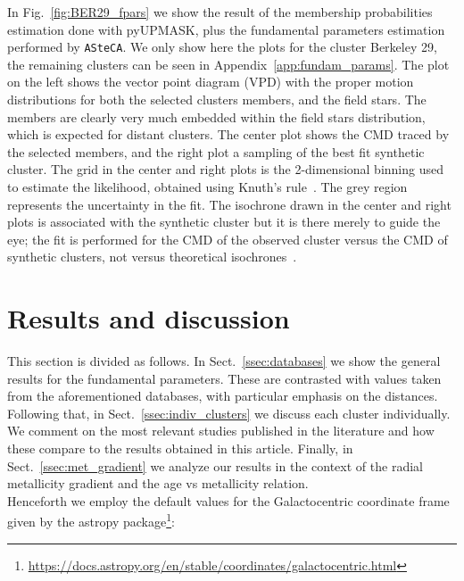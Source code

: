 \documentclass[referee]{aa}
\begin{document}
  In Fig.~\ref{fig:BER29_fpars} we show the result of the membership
  probabilities estimation done with pyUPMASK, plus the fundamental parameters
  estimation performed by \texttt{ASteCA}. We only show here the plots for
  the cluster Berkeley 29, the remaining clusters can be seen in
  Appendix~\ref{app:fundam_params}.
  The plot on the left shows the vector point diagram (VPD) with the proper
  motion distributions for both the selected clusters members, and the field
  stars. The members are clearly very much embedded within the field stars
  distribution, which is expected for distant clusters. The center plot shows
  the CMD traced by the selected members, and the right plot a sampling of the
  best fit synthetic cluster. The grid in the center and right plots is
  the 2-dimensional binning used to estimate the likelihood, obtained using
  Knuth's rule~\citep{Knuth_2006}. The grey region represents the uncertainty
  in the fit. The isochrone drawn in the center and right plots is associated
  with the synthetic cluster but it is there merely to guide the eye; the fit is
  performed for the CMD of the observed cluster versus the CMD of synthetic
  clusters, not versus theoretical isochrones~\citep[this is further
  explained in:][]{Perren_2015,Perren_2017,Perren_2020}.\\








\section{Results and discussion}
 \label{sec:results}

 This section is divided as follows.
 In Sect.~\ref{ssec:databases} we show the general results for the
 fundamental parameters. These are contrasted with values taken from the
 aforementioned databases, with particular emphasis on the distances.
 Following that, in Sect.~\ref{ssec:indiv_clusters} we discuss each cluster
 individually. We comment on the most relevant studies published in the
 literature and how these compare to the results obtained in this article.
 Finally, in Sect.~\ref{ssec:met_gradient} we analyze our results in the context
 of the radial metallicity gradient and the age vs metallicity relation.\\

 Henceforth we employ the default values for the Galactocentric coordinate
 frame given by the astropy
 package\footnote{\url{https://docs.astropy.org/en/stable/coordinates/galactocentric.html}}:
\end{document}
